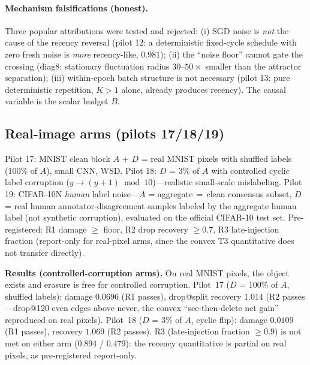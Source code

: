 \documentclass{article}
\newcommand{\B}{B}            %
\begin{document}
\paragraph{Mechanism falsifications (honest).} Three popular attributions were tested and
rejected: (i) SGD noise is \emph{not} the cause of the recency reversal (pilot 12: a
deterministic fixed-cycle schedule with zero fresh noise is \emph{more} recency-like, $0.981$);
(ii) the ``noise floor'' cannot gate the crossing (diag8: stationary fluctuation radius
$30$--$50\times$ smaller than the attractor separation); (iii) within-epoch batch structure is
not necessary (pilot 13: pure deterministic repetition, $K{>}1$ alone, already produces recency).
The causal variable is the scalar budget $\B$.

\subsection{Real-image arms (pilots 17/18/19)}
\label{sec:real}
Pilot 17: MNIST clean block $A$ + $D$ = real MNIST pixels with shuffled labels (100\% of $A$),
small CNN, WSD. Pilot 18: $D$ = 3\% of $A$ with controlled cyclic label corruption
($y\!\to\!(y{+}1)\bmod 10$)---realistic small-scale mislabeling. Pilot 19: CIFAR-10N
\emph{human} label noise---$A$ = aggregate$\,=\,$clean consensus subset, $D$ = real human
annotator-disagreement samples labeled by the aggregate human label (not synthetic corruption),
evaluated on the official CIFAR-10 test set. Pre-registered: R1 damage $\ge$ floor, R2 drop
recovery $\ge0.7$, R3 late-injection fraction (report-only for real-pixel arms, since the convex
T3 quantitative does not transfer directly).

\textbf{Results (controlled-corruption arms).} On real MNIST pixels, the object exists and
erasure is free for controlled corruption. Pilot~17 ($D$ = 100\% of $A$, shuffled labels):
damage $0.0696$ (R1 passes), drop@split recovery $1.014$ (R2 passes---drop@120 even edges above
never, the convex ``see-then-delete net gain'' reproduced on real pixels). Pilot~18 ($D$ = 3\%
of $A$, cyclic flip): damage $0.0109$ (R1 passes), recovery $1.069$ (R2 passes). R3 (late-injection
fraction $\ge0.9$) is not met on either arm ($0.894$ / $0.479$): the recency quantitative is
partial on real pixels, as pre-registered report-only.
\end{document}
